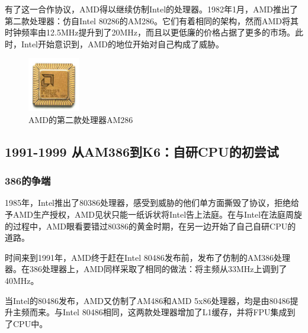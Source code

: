 \documentclass[UTF8]{ctexart}
\begin{document}
有了这一合作协议，AMD得以继续仿制Intel的处理器。1982年1月，AMD推出了第二款处理器：仿自Intel 80286的AM286。它们有着相同的架构，然而AMD将其时钟频率由12.5MHz提升到了20MHz，而且以更低廉的价格占据了更多的市场。此时，Intel开始意识到，AMD的地位开始对自己构成了威胁。

\begin{figure}[H]
    \begin{center}
        \includegraphics[width=0.2\textwidth]{figure/AM286.jpg}
        \caption{AMD的第二款处理器AM286}
    \end{center}
\end{figure}

\subsection{1991-1999 从AM386到K6：自研CPU的初尝试}

\subsubsection{386的争端}
1985年，Intel推出了80386处理器，感受到威胁的他们单方面撕毁了协议，拒绝给予AMD生产授权，AMD见状只能一纸诉状将Intel告上法庭。在与Intel在法庭周旋的过程中，AMD眼看要错过80386的黄金时期，在另一边开始了自己自研CPU的道路。

时间来到1991年，AMD终于赶在Intel 80486发布前，发布了仿制的AM386处理器。在386处理器上，AMD同样采取了相同的做法：将主频从33MHz上调到了40MHz。

当Intel的80486发布，AMD又仿制了AM486和AMD 5x86处理器，均是由80486提升主频而来。与Intel 80486相同，这两款处理器增加了L1缓存，并将FPU集成到了CPU中。
\end{document}
